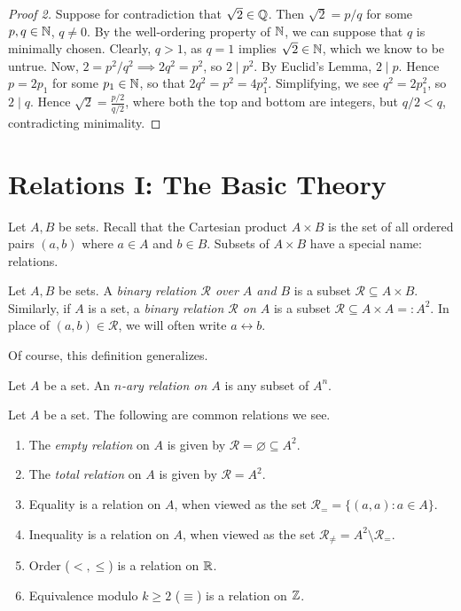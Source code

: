 \documentclass{article}
\begin{document}
\begin{proof}[Proof 2]
Suppose for contradiction that $\sqrt 2\in\mathbb Q$. Then $\sqrt 2 = p/q$ for some $p,q\in\mathbb N$, $q\neq 0$. By the well-ordering property of $\mathbb N$, we can suppose that $q$ is minimally chosen. Clearly, $q > 1$, as $q=1$ implies $\sqrt 2\in \mathbb N$, which we know to be untrue. Now, $2 = p^2/q^2 \implies 2q^2 = p^2$, so $2\mid p^2$. By Euclid's Lemma, $2\mid p$. Hence $p = 2p_1$ for some $p_1\in\mathbb N$, so that $2q^2 = p^2 = 4p_1^2$. Simplifying, we see $q^2 = 2p_1^2$, so $2\mid q$. Hence $\sqrt 2 = \frac{p/2}{q/2}$, where both the top and bottom are integers, but $q/2 < q$, contradicting minimality.
\end{proof}

\section{Relations I: The Basic Theory}
Let $A,B$ be sets. Recall that the Cartesian product $A\times B$ is the set of all ordered pairs $(a,b)$ where $a\in A$ and $b\in B$. Subsets of $A\times B$ have a special name: relations.
\begin{definition}
Let $A,B$ be sets. A \textit{binary relation $\mathcal R$ over $A$ and $B$} is a subset $\mathcal R\subseteq A\times B$. Similarly, if $A$ is a set, a \textit{binary relation $\mathcal R$ on $A$} is a subset $\mathcal R\subseteq A\times A =: A^2$. In place of $(a,b)\in\mathcal R$, we will often write $a \rel b$.
\end{definition}

Of course, this definition generalizes.
\begin{definition}
Let $A$ be a set. An \textit{$n$-ary relation on $A$} is any subset of $A^n$.
\end{definition}

\begin{example}
Let $A$ be a set. The following are common relations we see.
\begin{enumerate}
    \item The \textit{empty relation} on $A$ is given by $\mathcal R = \varnothing \subseteq A^2$.
    \item The \textit{total relation} on $A$ is given by $\mathcal R = A^2$.
    \item Equality is a relation on $A$, when viewed as the set $\mathcal R_= = \{(a, a): a\in A\}$.
    \item Inequality is a relation on $A$, when viewed as the set $\mathcal R_{\neq} = A^2\setminus \mathcal R_=$.
    \item Order ($<, \leq$) is a relation on $\mathbb R$.
    \item Equivalence modulo $k\geq 2$ ($\equiv$) is a relation on $\mathbb Z$.
\end{enumerate}
\end{example}
\end{document}
